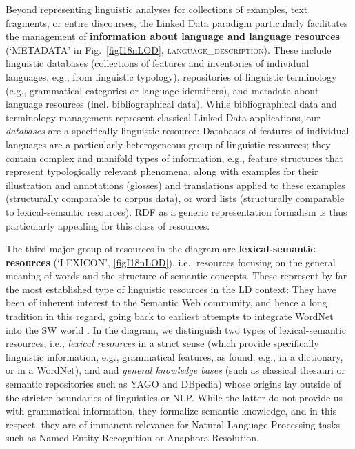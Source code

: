 Beyond representing linguistic analyses for collections of examples, text fragments, or entire discourses, 
the Linked Data paradigm particularly facilitates the management of \textbf{information about language and language resources} (`METADATA' in Fig.\ \ref{figI18nLOD}, \textsc{language\_description}).
These include linguistic databases (collections of features and inventories of individual languages, e.g., from linguistic typology), repositories of linguistic terminology (e.g., grammatical categories or language identifiers), and metadata about language resources (incl. bibliographical data).
While bibliographical data and terminology management represent classical Linked Data applications, our \emph{databases} are a specifically linguistic resource:
Databases of features of individual languages are a particularly heterogeneous group of linguistic resources; they contain complex and manifold types of information, e.g., feature structures that represent typologically relevant phenomena, along with examples for their illustration and annotations (glosses) and translations applied to these examples (structurally comparable to corpus data), or word lists (structurally comparable to lexical-semantic resources). RDF as a generic representation formalism is thus particularly appealing for this class of resources.

The third major group of resources in the diagram are \textbf{lexical-semantic resources} (`LEXICON', \ref{figI18nLOD}), i.e., resources focusing on the general meaning of words and the structure of semantic concepts. 
These represent by far the most established type of linguistic resources in the LD context: They have been of inherent interest to the Semantic Web community, and hence a long tradition in this regard, going back to earliest attempts to integrate WordNet into the SW world \citep{gangemi2003ontowordnet}. 
In the diagram, we distinguish two types of lexical-semantic resources, i.e., \emph{lexical resources} in a strict sense (which provide specifically linguistic information, e.g., grammatical features, as found, e.g., in a dictionary, or in a WordNet), and and \emph{general knowledge bases} (such as classical thesauri or semantic repositories such as YAGO and DBpedia) 
whose origins lay outside of the stricter boundaries of linguistics or NLP. 
While the latter do not provide us with grammatical information, they formalize semantic knowledge, and in this respect, they are of immanent relevance for Natural Language Processing tasks such as Named Entity Recognition or Anaphora Resolution. 


